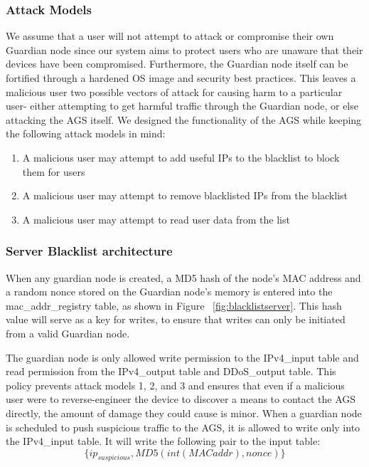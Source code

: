 \subsubsection{Attack Models}
\label{sec:design:attacks}
We assume that a user will not attempt to attack or compromise their own Guardian node since our system aims to protect users who are unaware that their devices have been compromised. Furthermore, the Guardian node itself can be fortified through a hardened OS image and security best practices. This leaves a malicious user two possible vectors of attack for causing harm to a particular user- either attempting to get harmful traffic through the Guardian node, or else attacking the AGS itself. 
We designed the functionality of the AGS while keeping the following attack models in mind:

\begin{enumerate}
\item A malicious user may attempt to add useful IPs to the blacklist to block them for users
\item A malicious user may attempt to remove blacklisted IPs from the blacklist
\item A malicious user may attempt to read user data from the list
\end{enumerate}

\subsubsection{Server Blacklist architecture}
\label{sec:design:blacklist}
When any guardian node is created, a MD5 hash of the node's MAC address and a random nonce stored on the Guardian node's memory is entered into the mac_addr_registry table, as shown in Figure ~\ref{fig:blacklistserver}. This hash value will serve as a key for writes, to ensure that writes can only be initiated from a valid Guardian node.

The guardian node is only allowed write permission to the IPv4_input table and read permission from the IPv4_output table and DDoS_output table. This policy prevents attack models 1, 2, and 3 and ensures that even if a malicious user were to reverse-engineer the device to discover a means to contact the AGS directly, the amount of damage they could cause is minor. When a guardian node is scheduled to push suspicious traffic to the AGS, it is allowed to write only into the IPv4_input table. It will write the following pair to the input table: \[\{ip_{suspicious}, MD5(int(MAC addr), nonce)\}\] 

